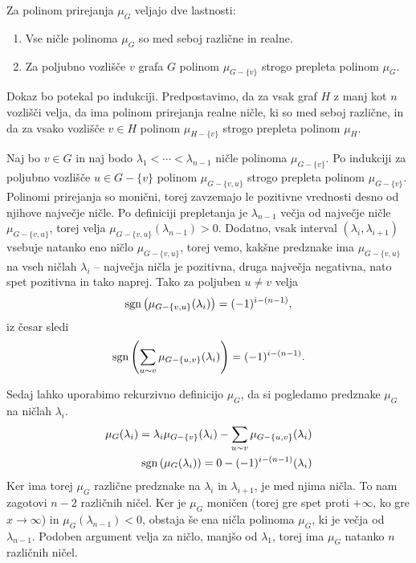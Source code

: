 \begin{izrek}
    Za polinom prirejanja \(\mu_G\) veljajo dve lastnosti:
    \begin{enumerate}
        \item Vse ničle polinoma \(\mu_G\) so med seboj različne in realne.
        \item Za poljubno vozlišče \(v\) grafa \(G\) polinom \(\mu_{G-\{v\}}\) strogo prepleta polinom \(\mu_G\).
    \end{enumerate}
\end{izrek}
\begin{dokaz}
    Dokaz bo potekal po indukciji. Predpostavimo, da za vsak graf \(H\) z manj kot \(n\) vozlišči velja, da ima polinom prirejanja realne ničle, ki so med seboj različne, in da za vsako vozlišče \(v\in H\) polinom \(\mu_{H-\{v\}}\) strogo prepleta polinom \(\mu_H\).

    Naj bo \(v\in G\) in naj bodo \(\lambda_1 < \cdots < \lambda_{n-1}\) ničle polinoma \(\mu_{G-\{v\}}\). Po indukciji za poljubno vozlišče \(u\in G-\{v\}\) polinom \(\mu_{G-\{v, u\}}\) strogo prepleta polinom \(\mu_{G-\{v\}}\). Polinomi prirejanja so monični, torej zavzemajo le pozitivne vrednosti desno od njihove največje ničle. Po definiciji prepletanja je \(\lambda_{n-1}\) večja od največje ničle \(\mu_{G-\{v, u\}}\), torej velja \(\mu_{G-\{v, u\}}(\lambda_{n-1}) > 0\). Dodatno, vsak interval \((\lambda_i, \lambda_{i+1})\) vsebuje natanko eno ničlo \(\mu_{G-\{v, u\}}\), torej vemo, kakšne predznake ima \(\mu_{G-\{v, u\}}\) na vseh ničlah \(\lambda_i\) -- največja ničla je pozitivna, druga največja negativna, nato spet pozitivna in tako naprej. Tako za poljuben \(u\neq v\) velja
    \begin{align*}
        \operatorname{sgn}\left({\mu_{G-\{v, u\}}(\lambda_i)}\right) = (-1)^{i-(n-1)},
    \end{align*}
    iz česar sledi
    \begin{align*}
        \operatorname{sgn}\left({\sum_{u\sim v} \mu_{G-\{u, v\}}(\lambda_i)}\right) = (-1)^{i - (n-1)}.
    \end{align*}

    Sedaj lahko uporabimo rekurzivno definicijo \(\mu_G\), da si pogledamo predznake \(\mu_G\) na ničlah \(\lambda_i\).
    \begin{align*}
        \mu_G(\lambda_i) = \lambda_i \mu_{G-\{v\}}(\lambda_i) - \sum_{u\sim v} \mu_{G-\{u, v\}}(\lambda_i) \\
        \operatorname{sgn}\left({\mu_G(\lambda_i)}\right) = 0 - (-1)^{i-(n-1)} (\lambda_i)
    \end{align*}
    Ker ima torej \(\mu_G\) različne predznake na \(\lambda_i\) in \(\lambda_{i+1}\), je med njima ničla. To nam zagotovi \(n-2\) različnih ničel. Ker je \(\mu_G\) moničen (torej gre spet proti \(+\infty\), ko gre \(x\to \infty\)) in \(\mu_G(\lambda_{n-1}) < 0\), obstaja še ena ničla polinoma \(\mu_G\), ki je večja od \(\lambda_{n-1}\). Podoben argument velja za ničlo, manjšo od \(\lambda_1\), torej ima \(\mu_G\) natanko \(n\) različnih ničel.
\end{dokaz}

